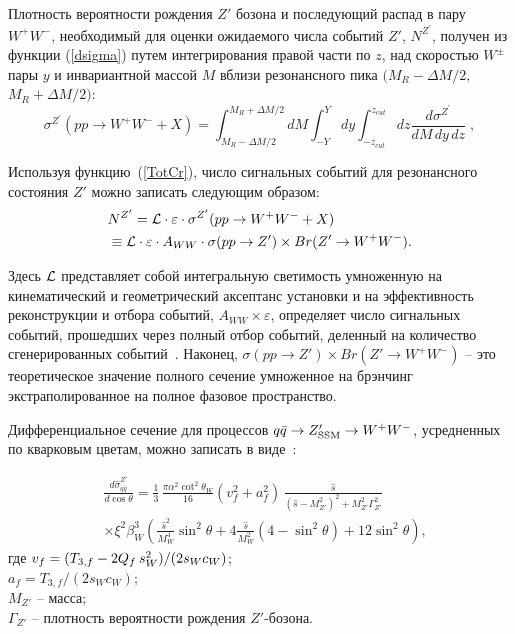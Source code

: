 Плотность вероятности рождения $ Z '$ бозона и
последующий распад в пару $ W ^ + W ^ - $, необходимый для оценки
ожидаемого числа событий $ Z '$, $ N ^ {Z ^ \prime} $, получен
из функции (\ref{dsigma}) путем интегрирования правой части по $ z $,
над скоростью $ W ^ \pm $ пары $ y $ и инвариантной массой $ M $
вблизи резонансного пика $ (M_R- \Delta M / 2, $ $ M_R + \Delta M / 2) $:
\begin{equation}
\sigma^{Z^\prime}{(pp\to W^+W^- + X)}  =\int_{M_{R}-\Delta
	M/2}^{M_{R}+\Delta M/2}d M \int_{-Y}^{Y}d y
\int_{-z_{cut}}^{z_{cut}}d
z\frac{d\sigma^{Z^\prime}}{d M\, d y\, d z}\;, \label{TotCr}
\end{equation}

Используя функцию~(\ref{TotCr}), число сигнальных событий для резонансного состояния $ Z '$ можно записать следующим образом:
\begin{align}
&N^{Z^\prime}= {\cal L}\cdot\varepsilon\cdot
\sigma^{Z^\prime}{(pp\to W^+W^- + X)}\nonumber \\ &\equiv {\cal
	L}\cdot\varepsilon\cdot A_{WW}\cdot \sigma(pp\to Z') \times {Br}(Z' \to W^+W^-).
\label{signal}
\end{align}

Здесь $ {\cal L} $ представляет собой интегральную светимость умноженную на кинематический и геометрический аксептанс установки и на эффективность реконструкции и отбора событий, $ A_ {WW} \times \varepsilon $, определяет число сигнальных событий, прошедших через полный отбор событий, деленный на количество сгенерированных событий~\cite{2part-pankov}. Наконец, $ \sigma (pp \to Z ') \times {Br} (Z' \to W ^ + W ^ -) $ -- это теоретическое значение полного сечение умноженное на брэнчинг экстраполированное на полное фазовое пространство.

Дифференциальное сечение для процессов $ q \bar {q} \to Z '_ {\rm SSM} \to W ^ + W ^ - $, усредненных по кварковым цветам, можно записать в виде~\cite{2part-pankov}:

\begin{align}
&\frac{d\hat{\sigma}^{Z'}_{q \bar q}}{d \cos\theta}
= \frac{1}{3}\,\frac{\pi\alpha^2 \cot^2\theta_W}{16 }
\left(v_{f}^2 + a_{f}^2\right)\, \frac{\hat{s}}
{\left(\hat{s} - M_{Z'}^2\right)^2 + M_{Z'}^2\Gamma_{Z'}^2}  \nonumber \\
& \times  \xi^2\beta_W^3 \left(\frac{\hat{s}^2}{M_W^4}
\sin^2\theta +
4\frac{\hat{s}}{M_W^2}(4-\sin^2\theta)+12\sin^2\theta\right),
\label{xsection2}
\end{align}
где $v_f=(T_{3,f}-2Q_f\hskip 2pt s_W^2)/(2s_Wc_W)$;\\
$a_f=T_{3,f}/(2s_Wc_W)$;\\
$M_{Z'}$ -- масса;\\
$\Gamma_{Z'}$ -- плотность вероятности рождения $Z'$-бозона.

